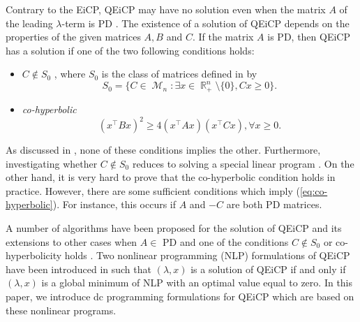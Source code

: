 \documentclass[3p]{elsarticle}
\DeclareMathOperator{\R}{\mathbb{R}}
\DeclareMathOperator{\M}{\mathcal{M}}
\begin{document}
Contrary to the EiCP, QEiCP may have no solution even when the matrix $A$ of the leading $\lambda$-term is PD \cite{Bras16}. The existence of a solution of QEiCP depends on the properties of the given matrices $A,B$ and $C$. If the matrix $A$ is PD, then QEiCP has a solution if one of the two following conditions holds:
\begin{itemize}[(i)]
	\item $C\notin S_0$ \cite{Bras16}, where $S_0$ is the class of matrices defined in \cite{Cottle} by
	\begin{equation}
	S_0=\{C\in \M_n: \exists x\in \R^n_+\setminus\{0\}, Cx\geq 0\}.
	\end{equation}
	\item \emph{co-hyperbolic} \cite{Seeger11} \begin{equation}\label{eq:co-hyperbolic}
	(x^{\top}Bx)^2\geq 4(x^{\top}Ax)(x^{\top}Cx), \forall x\geq 0.
	\end{equation}
\end{itemize}
As discussed in \cite{Bras16}, none of these conditions implies the other. Furthermore,  investigating whether $C\notin S_0$ reduces to solving a special linear program \cite{Bras16}. On the other hand, it is very hard to prove that the co-hyperbolic condition holds in practice. However, there are some sufficient conditions which imply (\ref{eq:co-hyperbolic}). For instance, this occurs if $A$ and $-C$ are both PD matrices.

A number of algorithms have been proposed for the solution of QEiCP and its extensions to other cases when $A\in$ PD and one of the conditions $C\notin S_0$ or co-hyperbolicity holds \cite{Adly11,Bras15,Bras16,Fernandes,Fernandes14,Iusem17,Iusem16,Seeger11}. Two nonlinear programming (NLP) formulations of QEiCP have been introduced in \cite{Bras16,Fernandes14} such that $(\lambda,x)$ is a solution of QEiCP if and only if $(\lambda,x)$ is a global minimum of NLP with an optimal value equal to zero. In this paper, we introduce dc programming formulations for QEiCP which are based on these nonlinear programs.
\end{document}
